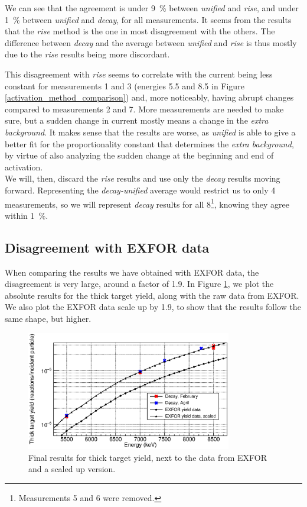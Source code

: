 \documentclass[a4paper,12pt]{report}
\begin{document}
We can see that the agreement is under \qty{9}{\percent} between \textit{unified} and \textit{rise}, and under \qty{1}{\percent} between \textit{unified} and \textit{decay}, for all measurements.
It seems from the results that the \textit{rise} method is the one in most disagreement with the others.
The difference between \textit{decay} and the average between \textit{unified} and \textit{rise} is thus mostly due to the \textit{rise} results being more discordant.

This disagreement with \textit{rise} seems to correlate with the current being less constant for measurements 1 and 3 (energies \num{5.5} and \num{8.5} in Figure \ref{activation_method_comparison}) and, more noticeably, having abrupt changes compared to measurements 2 and 7.
More measurements are needed to make sure, but a sudden change in current mostly means a change in the \textit{extra background}.
It makes sense that the results are worse, as \textit{unified} is able to give a better fit for the proportionality constant that determines the \textit{extra background}, by virtue of also analyzing the sudden change at the beginning and end of activation.
\\

We will, then, discard the \textit{rise} results and use only the \textit{decay} results moving forward.
Representing the \textit{decay-unified} average would restrict us to only 4 measurements, so we will represent \textit{decay} results for all 8\footnote{Measurements 5 and 6 were removed.}, knowing they agree within \qty{1}{\percent}.

\subsection{Disagreement with EXFOR data}
When comparing the results we have obtained with EXFOR data, the disagreement is very large, around a factor of \num{1.9}.
In Figure \ref{activation_final_results}, we plot the absolute results for the thick target yield, along with the raw data from EXFOR.
We also plot the EXFOR data scale up by \num{1.9}, to show that the results follow the same shape, but higher.

\begin{figure}[H]
	\centering
	\includegraphics[width=0.80\textwidth]{activation_final_results.eps}
	\caption{Final results for thick target yield, next to the data from EXFOR and a scaled up version.}
	\label{activation_final_results}
\end{figure}
\end{document}
